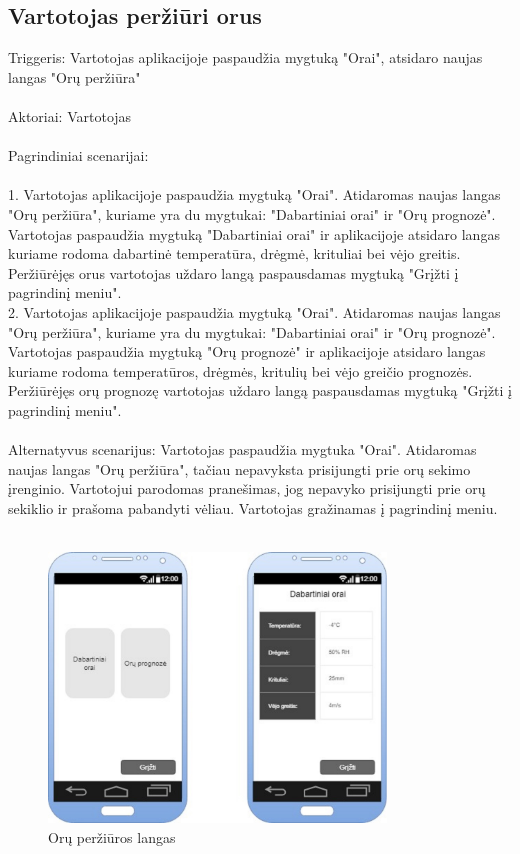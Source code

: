 \documentclass[oneside]{VUMIFPSkursinis}
\begin{document}
\subsection{Vartotojas peržiūri orus}
	Triggeris: Vartotojas aplikacijoje paspaudžia mygtuką "Orai", atsidaro naujas langas "Orų peržiūra" \\ \\
	Aktoriai: Vartotojas \\ \\
	Pagrindiniai scenarijai: \\ \\
1. Vartotojas aplikacijoje paspaudžia mygtuką "Orai". Atidaromas naujas langas "Orų peržiūra", kuriame yra du mygtukai: "Dabartiniai orai" ir "Orų prognozė". 		Vartotojas paspaudžia mygtuką "Dabartiniai orai" ir aplikacijoje atsidaro langas kuriame rodoma dabartinė temperatūra, drėgmė, krituliai bei vėjo greitis. Peržiūrėjęs orus vartotojas uždaro langą paspausdamas mygtuką "Grįžti į pagrindinį meniu". \\
2. Vartotojas aplikacijoje paspaudžia mygtuką "Orai". Atidaromas naujas langas "Orų peržiūra", kuriame yra du mygtukai: "Dabartiniai orai" ir "Orų prognozė". 		Vartotojas paspaudžia mygtuką "Orų prognozė" ir aplikacijoje atsidaro langas kuriame rodoma temperatūros, drėgmės, kritulių bei vėjo greičio prognozės. Peržiūrėjęs orų prognozę vartotojas uždaro langą paspausdamas mygtuką "Grįžti į pagrindinį meniu". \\ \\
	Alternatyvus scenarijus: Vartotojas paspaudžia mygtuka "Orai". Atidaromas naujas langas "Orų peržiūra", tačiau nepavyksta prisijungti prie orų sekimo įrenginio. Vartotojui parodomas pranešimas, jog nepavyko prisijungti prie orų sekiklio ir prašoma pabandyti vėliau. Vartotojas gražinamas į pagrindinį meniu. \\ \\

\begin{figure}[h]
    \centering
    \includegraphics[width=0.80\textwidth]{GUI11.jpg}
    \caption{Orų peržiūros langas}
    \label{fig:orai}
\end{figure}
\end{document}
